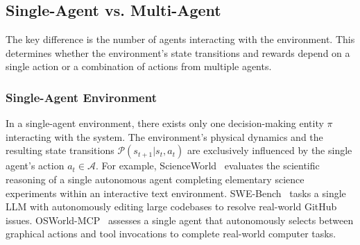 \subsection{Single-Agent vs. Multi-Agent}
\label{attribute:Single-Agent vs. Multi-Agent}
The key difference is the number of agents interacting with the environment. This determines whether the environment's state transitions and rewards depend on a single action or a combination of actions from multiple agents.
\subsubsection{Single-Agent Environment}
In a single-agent environment, there exists only one decision-making entity $\pi$ interacting with the system. The environment's physical dynamics and the resulting state transitions $\mathcal{P}(s_{t+1} | s_t, a_t)$ are exclusively influenced by the single agent's action $a_t \in \mathcal{A}$. For example, ScienceWorld~\cite{ScienceWorld} evaluates the scientific reasoning of a single autonomous agent completing elementary science experiments within an interactive text environment. SWE-Bench~\cite{SWE-Bench} tasks a single LLM with autonomously editing large codebases to resolve real-world GitHub issues. OSWorld-MCP~\cite{OSWorld-MCP} assesses a single agent that autonomously selects between graphical actions and tool invocations to complete real-world computer tasks.

